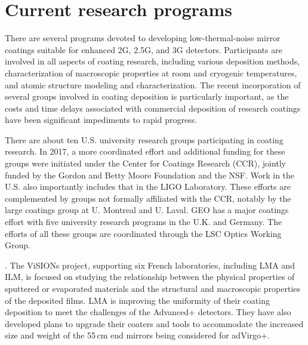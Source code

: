 \section{Current research programs}

There are several 
programs devoted to developing low-thermal-noise mirror coatings suitable for enhanced 2G, 2.5G, and 3G detectors. Participants are involved in all aspects of coating research, including various deposition methods, characterization of macroscopic properties at room and cryogenic temperatures, and atomic structure modeling and characterization. The recent incorporation 
of several groups involved in coating deposition is particularly important, as the costs and time delays associated with commercial deposition of research coatings have been significant impediments to rapid progress.

There are about ten U.S. university research groups participating in 
coating research. In 2017, a more coordinated effort and additional funding for these groups were initiated under the Center for Coatings Research (CCR), jointly funded by the Gordon and Betty Moore Foundation and the NSF. Work in the U.S. also importantly includes that in the LIGO Laboratory. These efforts are complemented by groups not formally affiliated with the CCR, notably by the large coatings group at U. Montreal and U. Laval. GEO has a major coatings effort with five university research programs in the U.K. and Germany. 
The efforts of all these groups are coordinated through 
the LSC Optics Working Group.

. The ViSIONs project, supporting six French laboratories, including LMA and ILM, is focused on studying the relationship between the physical properties of sputtered or evaporated materials and the structural and macroscopic properties of the deposited films. 
LMA is improving the uniformity of their coating deposition to meet the challenges of the Advanced+ detectors. They have also developed plans to upgrade their coaters and tools to accommodate the increased size and weight of the 55\,cm end mirrors being considered for adVirgo+.

